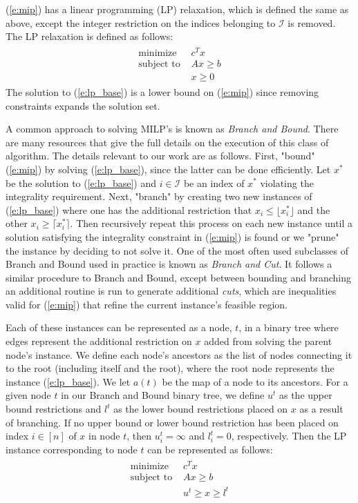 \documentclass[10pt]{article}
\begin{document}
	(\ref{e:mip}) has a linear programming (LP) relaxation, which is defined the same as above, except the integer restriction on the indices belonging to $ \mathcal{I} $ is removed. The LP relaxation is defined as follows:
	\begin{align}
		\begin{split}
			\text{minimize } & c^T x \\
			\text{subject to } & Ax \geq b \\
			& x \geq 0
		\end{split} \label{e:lp_base}
	\end{align}
	The solution to (\ref{e:lp_base}) is a lower bound on (\ref{e:mip}) since removing constraints expands the solution set.
	
	A common approach to solving MILP's is known as \textit{Branch and Bound}. There are many resources that give the full details on the execution of this class of algorithm. The details relevant to our work are as follows. First, "bound" (\ref{e:mip}) by solving (\ref{e:lp_base}), since the latter can be done efficiently. Let $ x^* $ be the solution to (\ref{e:lp_base}) and $ i \in \mathcal{I} $ be an index of $ x^* $ violating the integrality requirement. Next, "branch" by creating two new instances of (\ref{e:lp_base}) where one has the additional restriction that $ x_i \leq \lfloor x_i^* \rfloor $ and the other $ x_i \geq \lceil x_i^* \rceil $. Then recursively repeat this process on each new instance until a solution satisfying the integrality constraint in (\ref{e:mip}) is found or we "prune" the instance by deciding to not solve it. One of the most often used subclasses of Branch and Bound used in practice is known as \textit{Branch and Cut}. It follows a similar procedure to Branch and Bound, except between bounding and branching an additional routine is run to generate additional \textit{cuts}, which are inequalities valid for (\ref{e:mip}) that refine the current instance's feasible region.
	
	Each of these instances can be represented as a node, $ t $, in a binary tree where edges represent the additional restriction on $ x $ added from solving the parent node's instance. We define each node's ancestors as the list of nodes connecting it to the root (including itself and the root), where the root node represents the instance (\ref{e:lp_base}). We let $ a(t) $ be the map of a node to its ancestors. For a given node $ t $ in our Branch and Bound binary tree, we define $ u^t $ as the upper bound restrictions and $ l^t $ as the lower bound restrictions placed on $ x $ as a result of branching. If no upper bound or lower bound restriction has been placed on index $ i \in [n] $ of $ x $ in node $ t $, then $ u_i^t = \infty $ and $ l_i^t = 0 $, respectively. Then the LP instance corresponding to node $ t $ can be represented as follows:
	\begin{align}
		\begin{split}
			\text{minimize } & c^T x \\
			\text{subject to } & Ax \geq b \\
			& u^t \geq x \geq l^t
		\end{split} \label{e:lp}
	\end{align}
	
\end{document}
